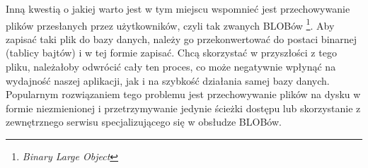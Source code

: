 \par Inną kwestią o jakiej warto jest w tym miejscu wspomnieć jest przechowywanie plików przesłanych przez użytkowników, czyli tak zwanych BLOBów \footnote{\emph{Binary Large Object}}. Aby zapisać taki plik do bazy danych, należy go przekonwertować do postaci binarnej (tablicy bajtów) i w tej formie zapisać. Chcą skorzystać w przyszłości z tego pliku, należałoby odwrócić cały ten proces, co może negatywnie wpłynąć na wydajność naszej aplikacji, jak i na szybkość działania samej bazy danych. Popularnym rozwiązaniem tego problemu jest przechowywanie plików na dysku w formie niezmienionej i przetrzymywanie jedynie ścieżki dostępu lub skorzystanie z zewnętrznego serwisu specjalizującego się w obsłudze BLOBów.